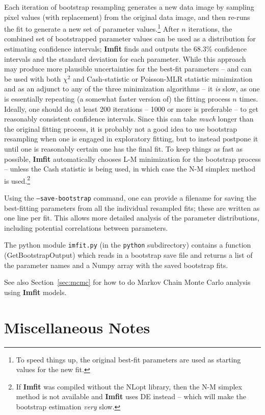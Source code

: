 \documentclass[10pt,a4paper,article]{memoir}
\newcommand{\imfit}{\textbf{Imfit}}
\newcommand{\Imfit}{\textbf{Imfit}}
\newcommand{\chisquare}{\ensuremath{\chi^{2}}}
\begin{document}
Each iteration of bootstrap resampling generates a new data image by
sampling pixel values (with replacement) from the original data image,
and then re-runs the fit to generate a new set of parameter
values.\footnote{To speed things up, the original best-fit parameters
are used as starting values for the new fit.} After $n$ iterations, the
combined set of bootstrapped parameter values can be used as a
distribution for estimating confidence intervals; \imfit{} finds and
outputs the 68.3\% confidence intervals and the standard deviation for
each parameter. While this approach may produce more plausible
uncertainties for the best-fit parameters -- and can be used with both
\chisquare{} and Cash-statistic or Poisson-MLR statistic minimization
and as an adjunct to any of the three minimization algorithms -- it
\textit{is} slow, as one is essentially repeating (a somewhat faster
version of) the fitting process $n$ times. Ideally, one should do at
least 200 iterations -- 1000 or more is preferable -- to get reasonably
consistent confidence intervals. Since this can take \textit{much}
longer than the original fitting process, it is probably not a good idea
to use bootstrap resampling when one is engaged in exploratory fitting,
but to instead postpone it until one is reasonably certain one has the
final fit. To keep things as fast as possible, \imfit{} automatically
chooses L-M minimization for the bootstrap process -- unless the
Cash statistic is being used, in which case the N-M simplex
method is used.\footnote{If \imfit{} was compiled without the NLopt
library, then the N-M simplex method is not available and \imfit{} uses
DE instead -- which will make the bootstrap estimation \textit{very}
slow.}

Using the \texttt{--save-bootstrap} command, one can provide a filename
for saving the best-fitting parameters from all the individual resampled
fits; these are written as one line per fit. This allows more detailed
analysis of the parameter distributions, including potential correlations
between parameters.

The python module \texttt{imfit.py} (in the \texttt{python} subdirectory)
contains a function (GetBootstrapOutput) which reads in a bootstrap save
file and returns a list of the parameter names and a Numpy array with
the saved bootstrap fits.

See also Section~\ref{sec:mcmc} for how to do Markov Chain Monte Carlo
analysis using \Imfit{} models.


\newpage

\chapter{Miscellaneous Notes}
\end{document}
